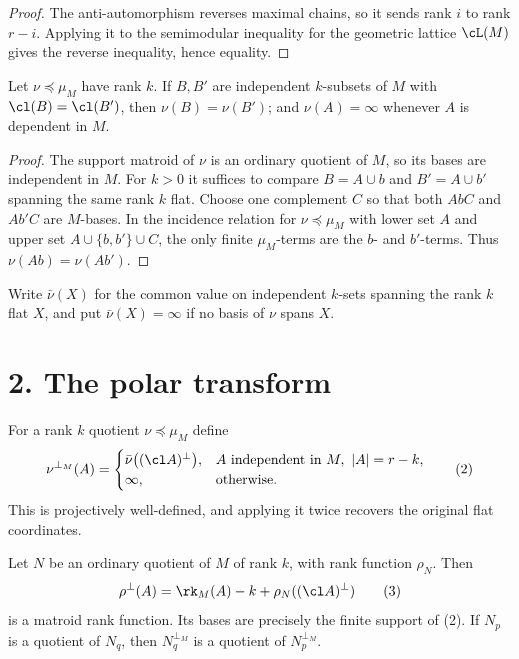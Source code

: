 \begin{proof}
The anti-automorphism reverses maximal chains, so it sends rank $i$ to
rank $r-i$.  Applying it to the semimodular inequality for the geometric
lattice $\cL(M)$ gives the reverse inequality, hence equality.
\end{proof}

\begin{lemma}\label{lem:flatconst}
Let $\nu\preceq\mu_M$ have rank $k$.  If $B,B'$ are independent
$k$-subsets of $M$ with $\cl(B)=\cl(B')$, then $\nu(B)=\nu(B')$; and
$\nu(A)=\infty$ whenever $A$ is dependent in $M$.
\end{lemma}

\begin{proof}
The support matroid of $\nu$ is an ordinary quotient of $M$, so its
bases are independent in $M$.  For $k>0$ it suffices to compare
$B=A\cup b$ and $B'=A\cup b'$ spanning the same rank $k$ flat.  Choose
one complement $C$ so that both $AbC$ and $Ab'C$ are $M$-bases.  In the
incidence relation for $\nu\preceq\mu_M$ with lower set $A$ and upper
set $A\cup\{b,b'\}\cup C$, the only finite $\mu_M$-terms are the
$b$- and $b'$-terms.  Thus $\nu(Ab)=\nu(Ab')$.
\end{proof}

Write $\bar\nu(X)$ for the common value on independent $k$-sets spanning
the rank $k$ flat $X$, and put $\bar\nu(X)=\infty$ if no basis of $\nu$
spans $X$.

\section*{2. The polar transform}

For a rank $k$ quotient $\nu\preceq\mu_M$ define
\[
 \nu^{\perp_M}(A)=
 \begin{cases}
   \bar\nu\bigl((\cl A)^\perp\bigr),
      & A\text{ independent in }M,\ |A|=r-k,\\
   \infty,&\text{otherwise.}
 \end{cases}                                                 \tag{2}
\]
This is projectively well-defined, and applying it twice recovers the
original flat coordinates.

\begin{lemma}\label{lem:ordinary}
Let $N$ be an ordinary quotient of $M$ of rank $k$, with rank function
$\rho_N$.  Then
\[
        \rho^\perp(A)=\rk_M(A)-k+\rho_N((\cl A)^\perp)          \tag{3}
\]
is a matroid rank function.  Its bases are precisely the finite support
of (2).  If $N_p$ is a quotient of $N_q$, then
$N_q^{\perp_M}$ is a quotient of $N_p^{\perp_M}$.
\end{lemma}

